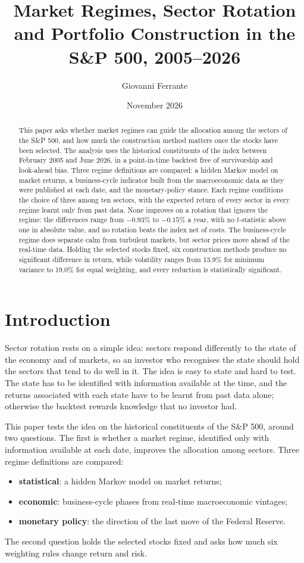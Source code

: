 \documentclass[11pt,a4paper]{article}
\title{\textbf{Market Regimes, Sector Rotation\\and Portfolio Construction in the S\&P 500, 2005--2026}}
\author{Giovanni Ferrante}
\date{November 2026}
\begin{document}
\maketitle

\begin{abstract}
\noindent
This paper asks whether market regimes can guide the allocation among the sectors of the S\&P 500, and how much the construction method matters once the stocks have been selected. The analysis uses the historical constituents of the index between February 2005 and June 2026, in a point-in-time backtest free of survivorship and look-ahead bias. Three regime definitions are compared: a hidden Markov model on market returns, a business-cycle indicator built from the macroeconomic data as they were published at each date, and the monetary-policy stance. Each regime conditions the choice of three among ten sectors, with the expected return of every sector in every regime learnt only from past data. None improves on a rotation that ignores the regime: the differences range from $-0.93\%$ to $-0.15\%$ a year, with no $t$-statistic above one in absolute value, and no rotation beats the index net of costs. The business-cycle regime does separate calm from turbulent markets, but sector prices move ahead of the real-time data. Holding the selected stocks fixed, six construction methods produce no significant difference in return, while volatility ranges from 13.9\% for minimum variance to 19.0\% for equal weighting, and every reduction is statistically significant.
\end{abstract}

\section{Introduction}

Sector rotation rests on a simple idea: sectors respond differently to the state of the economy and of markets, so an investor who recognises the state should hold the sectors that tend to do well in it. The idea is easy to state and hard to test. The state has to be identified with information available at the time, and the returns associated with each state have to be learnt from past data alone; otherwise the backtest rewards knowledge that no investor had.

This paper tests the idea on the historical constituents of the S\&P 500, around two questions. The first is whether a market regime, identified only with information available at each date, improves the allocation among sectors. Three regime definitions are compared:
\begin{itemize}
\item \textbf{statistical}: a hidden Markov model on market returns;
\item \textbf{economic}: business-cycle phases from real-time macroeconomic vintages;
\item \textbf{monetary policy}: the direction of the last move of the Federal Reserve.
\end{itemize}
The second question holds the selected stocks fixed and asks how much six weighting rules change return and risk.
\end{document}
